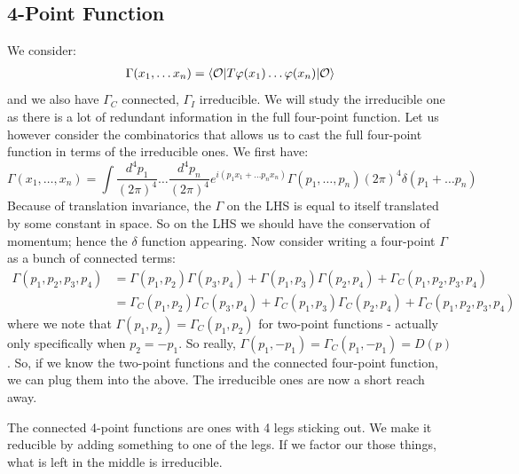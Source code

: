 \subsection{4-Point Function}
We consider:
\begin{equation}
    \begin{split}
        \Gamma(x_1, \ldots x_n) = \bra{\O}T\varphi(x_1) \ldots \varphi(x_n)\ket{\O}
    \end{split}
\end{equation}
and we also have $\Gamma_C$ connected, $\Gamma_I$ irreducible. We will study the irreducible one as there is a lot of redundant information in the full four-point function. Let us however consider the combinatorics that allows us to cast the full four-point function in terms of the irreducible ones. We first have:
\begin{equation}
    \Gamma(x_1, \ldots, x_n) = \int \frac{d^4p_1}{(2\pi)^4}\ldots \frac{d^4p_n}{(2\pi)^4} e^{i(p_1x_1 + \ldots p_n x_n)}\Gamma(p_1, \ldots, p_n)(2\pi)^4 \delta(p_1 + \ldots p_n)
\end{equation}
Because of translation invariance, the $\Gamma$ on the LHS is equal to itself translated by some constant in space. So on the LHS we should have the conservation of momentum; hence the $\delta$ function appearing. Now consider writing a four-point $\Gamma$ as a bunch of connected terms:
\begin{equation}
    \begin{split}
        \Gamma(p_1, p_2, p_3, p_4) &= \Gamma(p_1, p_2)\Gamma(p_3, p_4) + \Gamma(p_1, p_3)\Gamma(p_2, p_4) + \Gamma_C(p_1, p_2, p_3, p_4) 
        \\ &= \Gamma_C(p_1, p_2)\Gamma_C(p_3, p_4) + \Gamma_C(p_1, p_3)\Gamma_C(p_2, p_4) + \Gamma_C(p_1, p_2, p_3, p_4)
    \end{split}
\end{equation}
where we note that $\Gamma(p_1, p_2) = \Gamma_C(p_1, p_2)$ for two-point functions - actually only specifically when $p_2 = -p_1$. So really, $\Gamma(p_1, -p_1) = \Gamma_C(p_1, -p_1) = D(p)$. So, if we know the two-point functions and the connected four-point function, we can plug them into the above. The irreducible ones are now a short reach away. 

The connected 4-point functions are ones with 4 legs sticking out. We make it reducible by adding something to one of the legs. If we factor our those things, what is left in the middle is irreducible.

